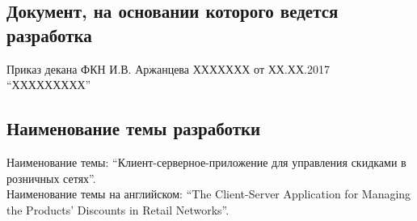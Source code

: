 \subsection{Документ, на основании которого ведется разработка}
Приказ декана ФКН И.В. Аржанцева
\textnumero ХХХХХХХ от ХХ.ХХ.2017 ``ХХХХХХХХХ''


\subsection{Наименование темы разработки}
Наименование темы: ``Клиент-серверное-приложение для управления скидками в розничных сетях''. \\
Наименование темы на английском: ``The Client-Server Application for Managing the Products' Discounts in Retail Networks''. \\

